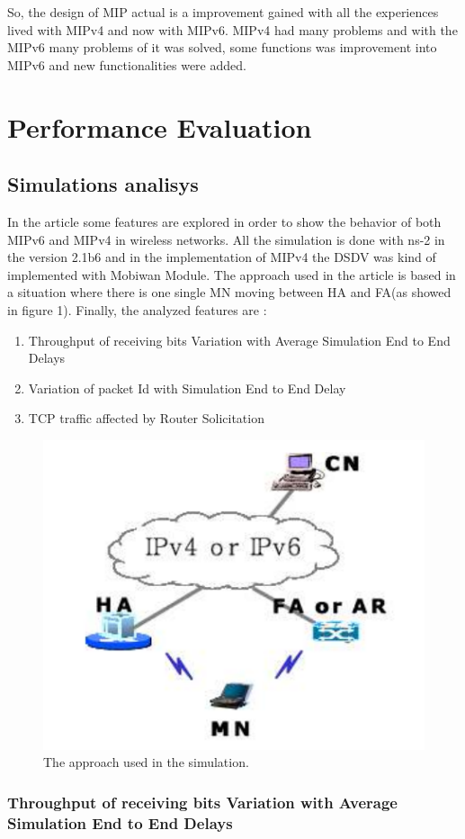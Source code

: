 \documentclass[12pt]{article}
\begin{document}
So, the design of MIP actual is a improvement gained with all the experiences lived with MIPv4 and now with MIPv6. MIPv4 had many problems and with the MIPv6 many problems of it was solved, some functions was improvement into MIPv6 and new functionalities were added.


\section{Performance Evaluation}

\subsection{Simulations analisys}
In the article some features are explored in order to show the behavior of both MIPv6 and MIPv4 in wireless networks. All the simulation is done with ns-2 in the version 2.1b6 and in the implementation of MIPv4 the DSDV was kind of implemented with 	Mobiwan Module. The approach used in the article is based in a situation where there is one single MN moving between HA and FA(as showed in figure 1). Finally, the analyzed features are : 
\begin{enumerate}
\item Throughput of receiving bits Variation with Average Simulation End to End Delays
\item Variation of packet Id with Simulation End to End Delay
\item TCP traffic affected by Router Solicitation
\end{enumerate} 


\begin{figure}[ht]
\centering
\includegraphics[width=.3\textwidth]{simulation_approach.png}
\caption{The approach used in the simulation.}
\label{fig:simulation_approach}
\end{figure}


\subsubsection{Throughput of receiving bits Variation with Average Simulation End to End Delays}
\end{document}
